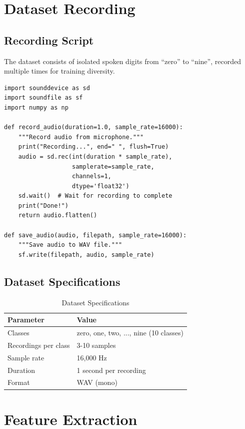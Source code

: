 \documentclass[a4paper,12pt]{article}
\begin{document}
\section{Dataset Recording}

\subsection{Recording Script}
The dataset consists of isolated spoken digits from ``zero'' to ``nine'', recorded multiple times for training diversity.

\begin{lstlisting}[style=pythonstyle]
import sounddevice as sd
import soundfile as sf
import numpy as np

def record_audio(duration=1.0, sample_rate=16000):
    """Record audio from microphone."""
    print("Recording...", end=" ", flush=True)
    audio = sd.rec(int(duration * sample_rate), 
                   samplerate=sample_rate, 
                   channels=1, 
                   dtype='float32')
    sd.wait()  # Wait for recording to complete
    print("Done!")
    return audio.flatten()

def save_audio(audio, filepath, sample_rate=16000):
    """Save audio to WAV file."""
    sf.write(filepath, audio, sample_rate)
\end{lstlisting}

\subsection{Dataset Specifications}
\begin{table}[h]
\centering
\begin{tabular}{|l|l|}
\hline
\textbf{Parameter} & \textbf{Value} \\
\hline
Classes & zero, one, two, ..., nine (10 classes) \\
\hline
Recordings per class & 3-10 samples \\
\hline
Sample rate & 16,000 Hz \\
\hline
Duration & 1 second per recording \\
\hline
Format & WAV (mono) \\
\hline
\end{tabular}
\caption{Dataset Specifications}
\end{table}

\section{Feature Extraction}
\end{document}
